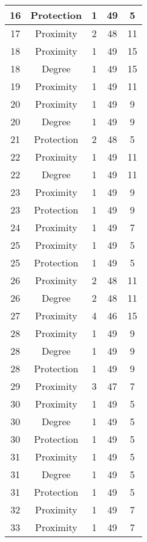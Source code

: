 \documentclass[results.tex]{subfiles}
\begin{document}
\begin{center}
\begin{tabular}{| c || c | c | c | c |}
    \hline
    16 & Protection & 1 & 49 & 5 \\ 
    \hline
    17 & Proximity & 2 & 48 & 11 \\ 
    \hline
    18 & Proximity & 1 & 49 & 15 \\ 
    \hline
    18 & Degree & 1 & 49 & 15 \\ 
    \hline
    19 & Proximity & 1 & 49 & 11 \\ 
    \hline
    20 & Proximity & 1 & 49 & 9 \\ 
    \hline
    20 & Degree & 1 & 49 & 9 \\ 
    \hline
    21 & Protection & 2 & 48 & 5 \\ 
    \hline
    22 & Proximity & 1 & 49 & 11 \\ 
    \hline
    22 & Degree & 1 & 49 & 11 \\ 
    \hline
    23 & Proximity & 1 & 49 & 9 \\ 
    \hline
    23 & Protection & 1 & 49 & 9 \\ 
    \hline
    24 & Proximity & 1 & 49 & 7 \\ 
    \hline
    25 & Proximity & 1 & 49 & 5 \\ 
    \hline
    25 & Protection & 1 & 49 & 5 \\ 
    \hline
    26 & Proximity & 2 & 48 & 11 \\ 
    \hline
    26 & Degree & 2 & 48 & 11 \\ 
    \hline
    27 & Proximity & 4 & 46 & 15 \\ 
    \hline
    28 & Proximity & 1 & 49 & 9 \\ 
    \hline
    28 & Degree & 1 & 49 & 9 \\ 
    \hline
    28 & Protection & 1 & 49 & 9 \\ 
    \hline
    29 & Proximity & 3 & 47 & 7 \\ 
    \hline
    30 & Proximity & 1 & 49 & 5 \\ 
    \hline
    30 & Degree & 1 & 49 & 5 \\ 
    \hline
    30 & Protection & 1 & 49 & 5 \\ 
    \hline
    31 & Proximity & 1 & 49 & 5 \\ 
    \hline
    31 & Degree & 1 & 49 & 5 \\ 
    \hline
    31 & Protection & 1 & 49 & 5 \\ 
    \hline
    32 & Proximity & 1 & 49 & 7 \\ 
    \hline
    33 & Proximity & 1 & 49 & 7 \\ 

\end{tabular}
\end{center}
\end{document}

